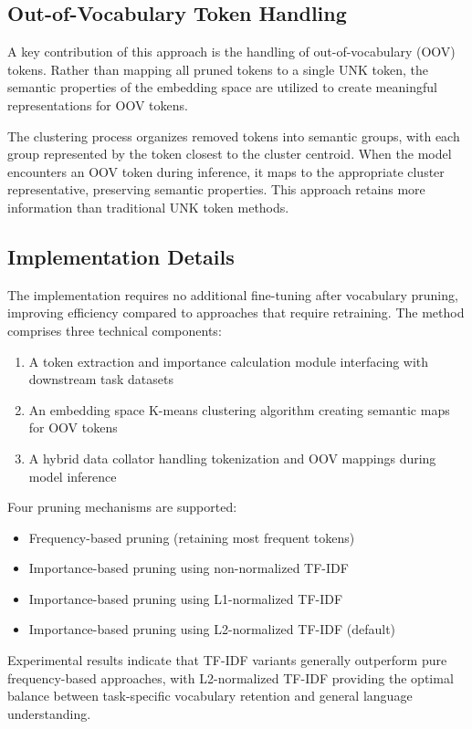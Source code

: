 \documentclass[twocolumn]{article}
\begin{document}
\subsection{Out-of-Vocabulary Token Handling}
A key contribution of this approach is the handling of out-of-vocabulary (OOV) tokens. Rather than mapping all pruned tokens to a single UNK token, the semantic properties of the embedding space are utilized to create meaningful representations for OOV tokens.

The clustering process organizes removed tokens into semantic groups, with each group represented by the token closest to the cluster centroid. When the model encounters an OOV token during inference, it maps to the appropriate cluster representative, preserving semantic properties. This approach retains more information than traditional UNK token methods.

\subsection{Implementation Details}
The implementation requires no additional fine-tuning after vocabulary pruning, improving efficiency compared to approaches that require retraining. The method comprises three technical components:

\begin{enumerate}
    \item A token extraction and importance calculation module interfacing with downstream task datasets
    \item An embedding space K-means clustering algorithm creating semantic maps for OOV tokens
    \item A hybrid data collator handling tokenization and OOV mappings during model inference
\end{enumerate}

Four pruning mechanisms are supported:
\begin{itemize}
    \item Frequency-based pruning (retaining most frequent tokens)
    \item Importance-based pruning using non-normalized TF-IDF
    \item Importance-based pruning using L1-normalized TF-IDF 
    \item Importance-based pruning using L2-normalized TF-IDF (default)
\end{itemize}

Experimental results indicate that TF-IDF variants generally outperform pure frequency-based approaches, with L2-normalized TF-IDF providing the optimal balance between task-specific vocabulary retention and general language understanding.
\end{document}
